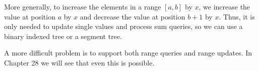 More generally, to increase the elements
in a range $[a,b]$ by $x$,
we increase the value at position $a$ by $x$
and decrease the value at position $b+1$ by $x$.
Thus, it is only needed to update single values
and process sum queries,
so we can use a binary indexed tree or a segment tree.

A more difficult problem is to support both
range queries and range updates.
In Chapter 28 we will see that even this is possible.



